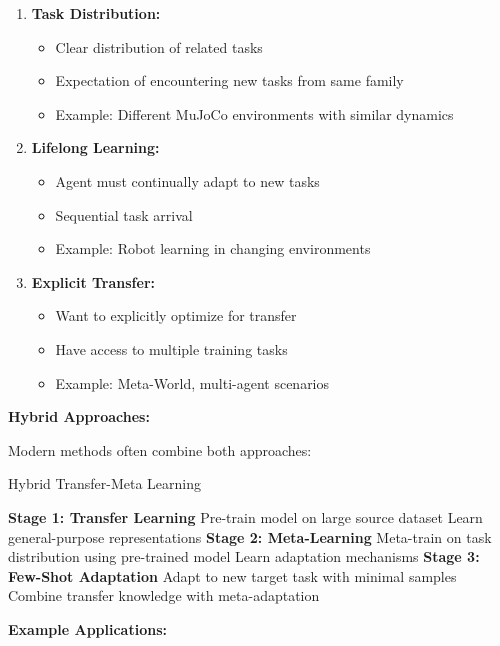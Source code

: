 \documentclass[12pt]{article}
\newcommand{\ieee}[1]{\textcolor{IEEEBlue}{\textbf{#1}}}
\begin{document}
{{\begin{enumerate}
				\item \textbf{Task Distribution:}
				\begin{itemize}
					\item Clear distribution of related tasks
					\item Expectation of encountering new tasks from same family
					\item Example: Different MuJoCo environments with similar dynamics
				\end{itemize}
				
				\item \textbf{Lifelong Learning:}
				\begin{itemize}
					\item Agent must continually adapt to new tasks
					\item Sequential task arrival
					\item Example: Robot learning in changing environments
				\end{itemize}
				
				\item \textbf{Explicit Transfer:}
				\begin{itemize}
					\item Want to explicitly optimize for transfer
					\item Have access to multiple training tasks
					\item Example: Meta-World, multi-agent scenarios
				\end{itemize}
			\end{enumerate}
			
			\ieee{Hybrid Approaches:}
			
			Modern methods often combine both approaches:
			
			\begin{algorithm}[H]
			\caption{Hybrid Transfer-Meta Learning}
			\begin{algorithmic}[1]
			\STATE \textbf{Stage 1: Transfer Learning}
			\STATE Pre-train model on large source dataset
			\STATE Learn general-purpose representations
			\STATE \textbf{Stage 2: Meta-Learning}
			\STATE Meta-train on task distribution using pre-trained model
			\STATE Learn adaptation mechanisms
			\STATE \textbf{Stage 3: Few-Shot Adaptation}
			\STATE Adapt to new target task with minimal samples
			\STATE Combine transfer knowledge with meta-adaptation
			\end{algorithmic}
			\end{algorithm}
			
			\textbf{Example Applications:}
			
}}
\end{document}
